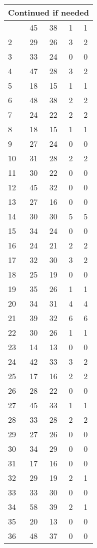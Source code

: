 \begin{center}
\begin{longtable}{l|c|c|c|c}
\hline \multicolumn{5}{|r|}{{Continued if needed}} \\ \hline
\endfoot 
1 & 45 & 38 & 1 & 1\\ \hline
2 & 29 & 26 & 3 & 2\\ \hline
3 & 33 & 24 & 0 & 0\\ \hline
4 & 47 & 28 & 3 & 2\\ \hline
5 & 18 & 15 & 1 & 1\\ \hline
6 & 48 & 38 & 2 & 2\\ \hline
7 & 24 & 22 & 2 & 2\\ \hline
8 & 18 & 15 & 1 & 1\\ \hline
9 & 27 & 24 & 0 & 0\\ \hline
10 & 31 & 28 & 2 & 2\\ \hline
11 & 30 & 22 & 0 & 0\\ \hline
12 & 45 & 32 & 0 & 0\\ \hline
13 & 27 & 16 & 0 & 0\\ \hline
14 & 30 & 30 & 5 & 5\\ \hline
15 & 34 & 24 & 0 & 0\\ \hline
16 & 24 & 21 & 2 & 2\\ \hline
17 & 32 & 30 & 3 & 2\\ \hline
18 & 25 & 19 & 0 & 0\\ \hline
19 & 35 & 26 & 1 & 1\\ \hline
20 & 34 & 31 & 4 & 4\\ \hline
21 & 39 & 32 & 6 & 6\\ \hline
22 & 30 & 26 & 1 & 1\\ \hline
23 & 14 & 13 & 0 & 0\\ \hline
24 & 42 & 33 & 3 & 2\\ \hline
25 & 17 & 16 & 2 & 2\\ \hline
26 & 28 & 22 & 0 & 0\\ \hline
27 & 45 & 33 & 1 & 1\\ \hline
28 & 33 & 28 & 2 & 2\\ \hline
29 & 27 & 26 & 0 & 0\\ \hline
30 & 34 & 29 & 0 & 0\\ \hline
31 & 17 & 16 & 0 & 0\\ \hline
32 & 29 & 19 & 2 & 1\\ \hline
33 & 33 & 30 & 0 & 0\\ \hline
34 & 58 & 39 & 2 & 1\\ \hline
35 & 20 & 13 & 0 & 0\\ \hline
36 & 48 & 37 & 0 & 0\\ \hline

\end{longtable}
\end{center}
